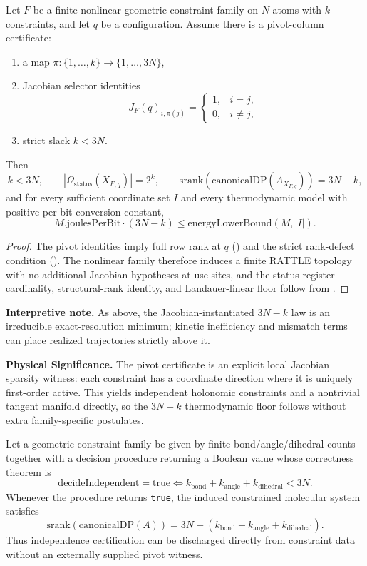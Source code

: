 \begin{corollary}\label{cor:jacobian-holonomic-floor}
Let $F$ be a finite nonlinear geometric-constraint family on $N$ atoms with $k$ constraints, and let $q$ be a configuration. Assume there is a pivot-column certificate:
\begin{enumerate}
\item a map $\pi : \{1,\dots,k\}\to\{1,\dots,3N\}$,
\item Jacobian selector identities
\[
J_F(q)_{i,\pi(j)}=
\begin{cases}
1,&i=j,\\
0,&i\neq j,
\end{cases}
\]
\item strict slack $k<3N$.
\end{enumerate}
Then
\[
k < 3N,
\qquad
\left|\Omega_{\mathrm{status}}(X_{F,q})\right| = 2^k,
\qquad
\mathrm{srank}(\mathrm{canonicalDP}(A_{X_{F,q}})) = 3N-k,
\]
and for every sufficient coordinate set $I$ and every thermodynamic model with positive per-bit conversion constant,
\[
M.\mathrm{joulesPerBit}\cdot(3N-k)
\le
\mathrm{energyLowerBound}(M,|I|).
\]
\end{corollary}

\begin{proof}
The pivot identities imply full row rank at $q$ () and the strict rank-defect condition (). The nonlinear family therefore induces a finite RATTLE topology with no additional Jacobian hypotheses at use sites, and the status-register cardinality, structural-rank identity, and Landauer-linear floor follow from .
\end{proof}

\textbf{Interpretive note.} As above, the Jacobian-instantiated $3N-k$ law is an irreducible exact-resolution minimum; kinetic inefficiency and mismatch terms can place realized trajectories strictly above it.

\textbf{Physical Significance.} The pivot certificate is an explicit local Jacobian sparsity witness: each constraint has a coordinate direction where it is uniquely first-order active. This yields independent holonomic constraints and a nontrivial tangent manifold directly, so the $3N-k$ thermodynamic floor follows without extra family-specific postulates.

\begin{theorem}\label{thm:geometric-constraint-decision-interface}
Let a geometric constraint family be given by finite bond/angle/dihedral counts together with a decision procedure returning a Boolean value whose correctness theorem is
\[
\mathrm{decideIndependent}=\mathrm{true}
\iff
k_{\mathrm{bond}}+k_{\mathrm{angle}}+k_{\mathrm{dihedral}}<3N.
\]
Whenever the procedure returns \texttt{true}, the induced constrained molecular system satisfies
\[
\mathrm{srank}(\mathrm{canonicalDP}(A))
=
3N-(k_{\mathrm{bond}}+k_{\mathrm{angle}}+k_{\mathrm{dihedral}}).
\]
Thus independence certification can be discharged directly from constraint data without an externally supplied pivot witness.
\end{theorem}

